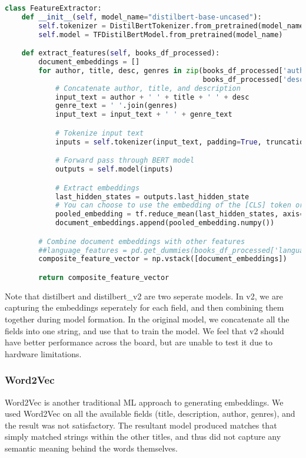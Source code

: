 \begin{lstlisting}[language=Python, caption={Feature Extraction using DistilBert}, label={lst:example}, linewidth=\linewidth, breaklines=true]
    class FeatureExtractor:
    def __init__(self, model_name="distilbert-base-uncased"):
        self.tokenizer = DistilBertTokenizer.from_pretrained(model_name)
        self.model = TFDistilBertModel.from_pretrained(model_name)

    def extract_features(self, books_df_processed):
        document_embeddings = []
        for author, title, desc, genres in zip(books_df_processed['author'], books_df_processed['title'],
                                               books_df_processed['description'], books_df_processed['genres']):
            # Concatenate author, title, and description
            input_text = author + ' ' + title + ' ' + desc
            genre_text = ' '.join(genres)
            input_text = input_text + ' ' + genre_text

            # Tokenize input text
            inputs = self.tokenizer(input_text, padding=True, truncation=True, return_tensors="tf")

            # Forward pass through BERT model
            outputs = self.model(inputs)

            # Extract embeddings
            last_hidden_states = outputs.last_hidden_state
            # You can choose to use the embedding of the [CLS] token or pool the embeddings to get a single vector
            pooled_embedding = tf.reduce_mean(last_hidden_states, axis=1)
            document_embeddings.append(pooled_embedding.numpy())

        # Combine document embeddings with other features
        ##language_features = pd.get_dummies(books_df_processed['language_code']).values
        composite_feature_vector = np.vstack([document_embeddings])

        return composite_feature_vector
\end{lstlisting}

Note that distilbert and distilbert\_v2 are two seperate models. In v2, we are capturing the embeddings seperately for each field, and then combining them together during model formation. In the original model, we concatenate all the fields into one string, and use that to train the model. We feel that v2 should have better performance across the board, but are unable to test it due to hardware limitations.

\subsubsection*{Word2Vec}
Word2Vec is another traditional ML approach to generating embeddings. We used Word2Vec on all the available fields (title, description, author, genres), and the result was not satisfactory. The resultant model produced matches that simply matched strings within the other titles, and thus did not capture any semantic meaning behind the words themselves.

